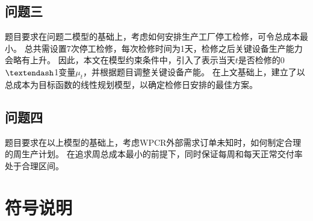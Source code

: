 \subsection{问题三}

题目要求在问题二模型的基础上，考虑如何安排生产工厂停工检修，可令总成本最小。
总共需设置7次停工检修，每次检修时间为1天，检修之后关键设备生产能力会略有上升。
因此，本文在模型约束条件中，引入了表示当天$t$是否检修的0$\textendash$1变量$\mu_t$，并根据题目调整关键设备产能。
在上文基础上，建立了以总成本为目标函数的线性规划模型，以确定检修日安排的最佳方案。



\subsection{问题四}

题目要求在以上模型的基础上，考虑WPCR外部需求订单未知时，如何制定合理的周生产计划。
在追求周总成本最小的前提下，同时保证每周和每天正常交付率处于合理区间。

\section{符号说明} %
\label{sec:符号说明}

\begin{table}[!htbp]
\centering
\caption[文中符号所用说明]{文中符号所用说明}
\end{table}

